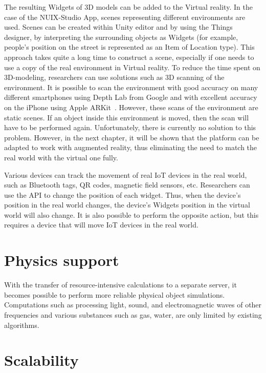 The resulting Widgets of 3D models can be added to the Virtual reality. In the case of the NUIX-Studio App, scenes representing different environments are used. Scenes can be created within Unity editor and by using the Things designer, by interpreting the surrounding objects as Widgets (for example, people's position on the street is represented as an Item of Location type). This approach takes quite a long time to construct a scene, especially if one needs to use a copy of the real environment in Virtual reality. To reduce the time spent on 3D-modeling, researchers can use solutions such as 3D scanning of the environment. It is possible to scan the environment with good accuracy on many different smartphones using Depth Lab from Google and with excellent accuracy on the iPhone using Apple ARKit~\cite{baek_two-dimensional_2020, breitbarth_measurement_2019}. However, these scans of the environment are static scenes. If an object inside this environment is moved, then the scan will have to be performed again. Unfortunately, there is currently no solution to this problem. However, in the next chapter, it will be shown that the platform can be adapted to work with augmented reality, thus eliminating the need to match the real world with the virtual one fully.

Various devices can track the movement of real IoT devices in the real world, such as Bluetooth tags, QR codes, magnetic field sensors, etc. Researchers can use the API to change the position of each widget. Thus, when the device's position in the real world changes, the device's Widgets position in the virtual world will also change. It is also possible to perform the opposite action, but this requires a device that will move IoT devices in the real world.

\section{Physics support}

With the transfer of resource-intensive calculations to a separate server, it becomes possible to perform more reliable physical object simulations. Computations such as processing light, sound, and electromagnetic waves of other frequencies and various substances such as gas, water, are only limited by existing algorithms.

\section{Scalability}


